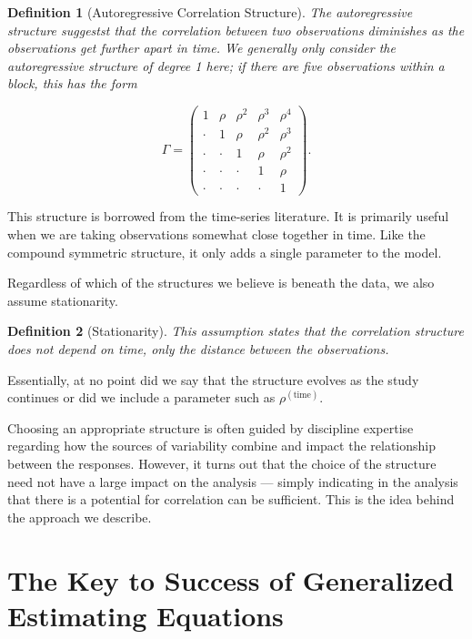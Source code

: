 \documentclass[
]{book}
\theoremstyle{plain}
\theoremstyle{mydefn}
\newtheorem{definition}{Definition}[chapter]
\theoremstyle{myexmpl}
\theoremstyle{remark}
\begin{document}
\begin{definition}[Autoregressive Correlation Structure]
The autoregressive structure suggestst that the correlation between two observations diminishes as the observations get further apart in time. We generally only consider the autoregressive structure of degree 1 here; if there are five observations within a block, this has the form

\[\Gamma = \begin{pmatrix} 
1 & \rho & \rho^2 & \rho^3 & \rho^4 \\
\cdot & 1 & \rho & \rho^2 & \rho^3 \\
\cdot & \cdot & 1 & \rho & \rho^2 \\
\cdot & \cdot & \cdot & 1 & \rho \\
\cdot & \cdot & \cdot & \cdot & 1 \end{pmatrix}.\]
\end{definition}

This structure is borrowed from the time-series literature. It is primarily useful when we are taking observations somewhat close together in time. Like the compound symmetric structure, it only adds a single parameter to the model.

Regardless of which of the structures we believe is beneath the data, we also assume stationarity.

\begin{definition}[Stationarity]
This assumption states that the correlation structure does not depend on time, only the distance between the observations.
\end{definition}

Essentially, at no point did we say that the structure evolves as the study continues or did we include a parameter such as \(\rho^{(\text{time})}\).

Choosing an appropriate structure is often guided by discipline expertise regarding how the sources of variability combine and impact the relationship between the responses. However, it turns out that the choice of the structure need not have a large impact on the analysis --- simply indicating in the analysis that there is a potential for correlation can be sufficient. This is the idea behind the approach we describe.

\hypertarget{the-key-to-success-of-generalized-estimating-equations}{%
\section{The Key to Success of Generalized Estimating Equations}\label{the-key-to-success-of-generalized-estimating-equations}}
\end{document}
